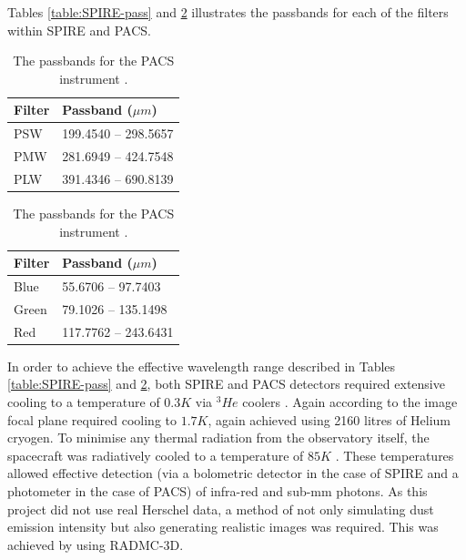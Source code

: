 \documentclass{report}
\begin{document}
Tables \ref{table:SPIRE-pass} and \ref{table:PACS-pass} illustrates the passbands for each of the filters within SPIRE and PACS.

\begin{table}[h]
  \captionsetup{width=0.3\textwidth}
  \parbox{.4\linewidth}{
  \centering
  \begin{tabular}{||l l||}
  \hline
  Filter & Passband ($\mu m$) \\ [0.5ex]
  \hline\hline
  PSW    &    199.4540 --	298.5657   \\
  \hline
  PMW    &    281.6949 --	424.7548   \\
  \hline
  PLW    &    391.4346 --	690.8139   \\ [1ex]
  \hline
  \end{tabular}
  \caption{\protect The passbands (for extended source) for the SPIRE instrument \parencite{pass}.}
  \label{table:SPIRE-pass}
  }
  \parbox{.4\linewidth}{
  \centering
  \begin{tabular}{||l l||}
  \hline
  Filter & Passband ($\mu m$) \\ [0.5ex]
  \hline\hline
  Blue   &    55.6706 -- 97.7403       \\
  \hline
  Green  &    79.1026 --	135.1498     \\
  \hline
  Red    &    117.7762 --	243.6431     \\ [1ex]
  \hline
  \end{tabular}
  \caption{\protect The passbands for the PACS instrument \parencite{pass}.}
  \label{table:PACS-pass}
  }
\end{table}

In order to achieve the effective wavelength range described in Tables \ref{table:SPIRE-pass} and \ref{table:PACS-pass}, both SPIRE and PACS detectors required extensive cooling to a temperature of $0.3 K$ via $^{3}{He}$ coolers \parencite{herschel}. Again according to \textcite{herschel} the image focal plane required cooling to $1.7 K$, again achieved using 2160 litres of Helium cryogen. To minimise any thermal radiation from the observatory itself, the spacecraft was radiatively cooled to a temperature of $85 K$ \parencite{herschel}. These temperatures allowed effective detection (via a bolometric detector in the case of SPIRE and a photometer in the case of PACS) of infra-red and sub-mm photons. As this project did not use real Herschel data, a method of not only simulating dust emission intensity but also generating realistic images was required. This was achieved by using RADMC-3D.
\end{document}
